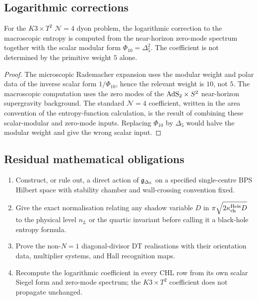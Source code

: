\subsection*{Logarithmic corrections}
\label{subsec:log-corrections-delta5}

\begin{theorem}[The \texorpdfstring{$\mathcal N=4$}{N=4} logarithmic
coefficient uses the scalar square]
\label{thm:log-correction-scalar-square}
For the $K3\times T^2$ $\mathcal N=4$ dyon problem, the logarithmic
correction to the macroscopic entropy is computed from the
near-horizon zero-mode spectrum together with the scalar modular form
$\Phi_{10}=\Delta_5^2$. The coefficient is not determined by the
primitive weight $5$ alone.
\end{theorem}

\begin{proof}
The microscopic Rademacher expansion uses the modular weight and polar
data of the inverse scalar form $1/\Phi_{10}$, hence the relevant weight
is $10$, not $5$. The macroscopic computation uses the zero modes of
the $\mathrm{AdS}_2\times S^2$ near-horizon supergravity background. The
standard $\mathcal N=4$ coefficient, written in the area convention of
the entropy-function calculation, is the result of combining these
scalar-modular and zero-mode inputs. Replacing $\Phi_{10}$ by
$\Delta_5$ would halve the modular weight and give the wrong scalar
input.
\end{proof}

\subsection*{Residual mathematical obligations}
\label{subsec:residual-obligations-heterotic}

\begin{enumerate}
\item Construct, or rule out, a direct action of
$\mathfrak{g}_{\Delta_5}$ on a specified single-centre BPS Hilbert space with
stability chamber and wall-crossing convention fixed.
\item Give the exact normalisation relating any shadow variable $D$ in
$\pi\sqrt{2\kappa_{\mathrm{ch}}^{\mathrm{Heis}}D}$ to the physical level $n_L$ or the
quartic invariant before calling it a black-hole entropy formula.
\item Prove the non-$N=1$ diagonal-divisor DT realisations with their
orientation data, multiplier systems, and Hall recognition maps.
\item Recompute the logarithmic coefficient in every CHL row from its
own scalar Siegel form and zero-mode spectrum; the $K3\times T^2$
coefficient does not propagate unchanged.
\end{enumerate}
